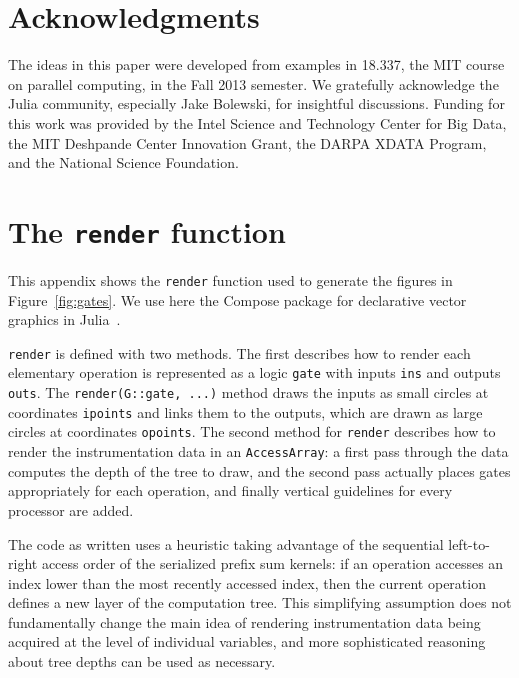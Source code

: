 \documentclass{sig-alternate}
\newcommand{\code}[1]{\texttt{#1}}
\begin{document}
\section{Acknowledgments}

The ideas in this paper were developed from examples in 18.337, the MIT course
on parallel computing, in the Fall 2013 semester. We gratefully acknowledge
the Julia community, especially Jake Bolewski, for insightful discussions.
Funding for this work was provided by the Intel Science and Technology Center
for Big Data, the MIT Deshpande Center Innovation Grant, the DARPA XDATA
Program, and the National Science Foundation.




\appendix

\section{The \code{render} function}
\label{sec:render}

This appendix shows the \code{render} function used to generate the figures in
Figure~\ref{fig:gates}. We use here the Compose package for declarative vector
graphics in Julia~\cite{Compose.jl}.

\code{render} is defined with two methods. The first describes how to render
each elementary operation is represented as a logic \code{gate} with inputs
\code{ins} and outputs \code{outs}. The \code{render(\allowbreak{}G::gate, ...)} method
draws the inputs as small circles at coordinates \code{ipoints} and links them
to the outputs, which are drawn as large circles at coordinates \code{opoints}.
The second method for \code{render} describes how to render the instrumentation
data in an \code{AccessArray}: a first pass through the data computes the depth
of the tree to draw, and the second pass actually places gates appropriately
for each operation, and finally vertical guidelines for every processor are
added.

The code as written uses a heuristic taking advantage of the sequential
left-to-right access order of the serialized prefix sum kernels: if an
operation accesses an index lower than the most recently accessed index, then
the current operation defines a new layer of the computation tree. This
simplifying assumption does not fundamentally change the main idea of rendering
instrumentation data being acquired at the level of individual variables, and
more sophisticated reasoning about tree depths can be used as necessary.
\end{document}

